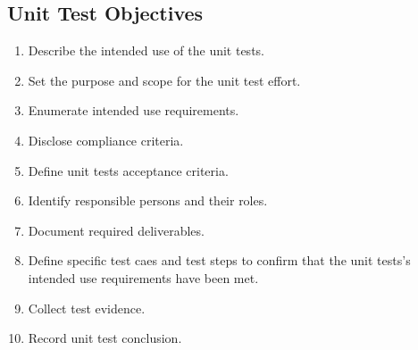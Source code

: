 \subsection{Unit Test Objectives}
\begin{enumerate}
  \item Describe the intended use of the unit tests.
  \item Set the purpose and scope for the unit test effort.
  \item Enumerate intended use requirements.
  \item Disclose compliance criteria.
  \item Define unit tests acceptance criteria.
  \item Identify responsible persons and their roles.
  \item Document required deliverables.
  \item Define specific test caes and test steps to confirm that the unit
    tests's intended use requirements have been met.
  \item Collect test evidence.
  \item Record unit test conclusion.
\end{enumerate}
